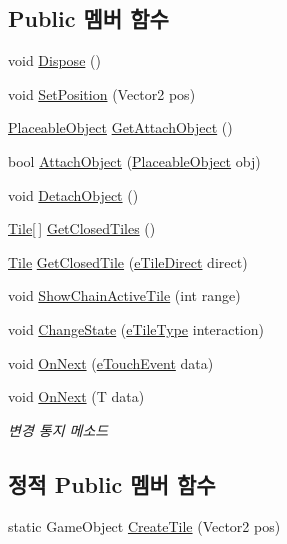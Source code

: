 \subsection*{Public 멤버 함수}
\begin{DoxyCompactItemize}
\item 
void \hyperlink{class_tile_a6e8a801e95a29156cbf32024e45c6596}{Dispose} ()
\item 
void \hyperlink{class_tile_a4d7a81b36513066aad741ed675164690}{Set\+Position} (Vector2 pos)
\item 
\hyperlink{class_placeable_object}{Placeable\+Object} \hyperlink{class_tile_a02150b69b975e8e9de1c3e10070a8dda}{Get\+Attach\+Object} ()
\item 
bool \hyperlink{class_tile_a1969ee41c320c6e7748a33374942e07e}{Attach\+Object} (\hyperlink{class_placeable_object}{Placeable\+Object} obj)
\item 
void \hyperlink{class_tile_ab8ab187ab674cfb222f761feac3b20b3}{Detach\+Object} ()
\item 
\hyperlink{class_tile}{Tile}\mbox{[}$\,$\mbox{]} \hyperlink{class_tile_a38b9f5c215f16448118e83e0d10aed05}{Get\+Closed\+Tiles} ()
\item 
\hyperlink{class_tile}{Tile} \hyperlink{class_tile_a838aaa6a94321629d04e944ed3bf8b9f}{Get\+Closed\+Tile} (\hyperlink{_tile_8cs_a082f743a62d2d8e13dac8fd38af246d7}{e\+Tile\+Direct} direct)
\item 
void \hyperlink{class_tile_a0ca6f4d1ddb0e7609749f1cf583b3c16}{Show\+Chain\+Active\+Tile} (int range)
\item 
void \hyperlink{class_tile_a2bb5c747e9483b803ea65b4341ce5af6}{Change\+State} (\hyperlink{_tile_8cs_a271bc07be325bca511bcb747e0ff2fda}{e\+Tile\+Type} interaction)
\item 
void \hyperlink{class_tile_afdb21c9f57ecd9953edfd92d8541f8a3}{On\+Next} (\hyperlink{_touch_manager_8cs_ae33e321a424fe84ba8b2fdb81ad40a68}{e\+Touch\+Event} data)
\item 
void \hyperlink{interface_m_c_n_1_1_i_observer_a2f934b71aa4ddf6f936670d32c3cdff7}{On\+Next} (T data)
\begin{DoxyCompactList}\small\item\em 변경 통지 메소드 \end{DoxyCompactList}\end{DoxyCompactItemize}
\subsection*{정적 Public 멤버 함수}
\begin{DoxyCompactItemize}
\item 
static Game\+Object \hyperlink{class_tile_aec3cdb55a67f4c12d3056355c15bdba2}{Create\+Tile} (Vector2 pos)
\end{DoxyCompactItemize}
